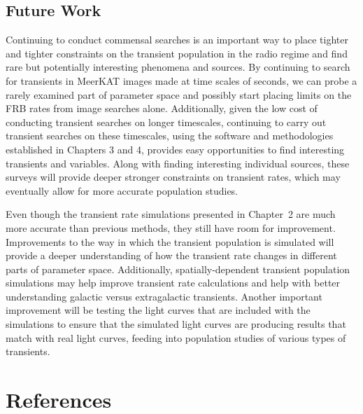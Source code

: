 \documentclass[12pt]{article}
\begin{document}
\subsection{Future Work}


Continuing to conduct commensal searches is an important way to place tighter and tighter constraints on the transient population in the radio regime and find rare but potentially interesting phenomena and sources. By continuing to search for transients in MeerKAT images made at time scales of seconds, we can probe a rarely examined part of parameter space and possibly start placing limits on the FRB rates from image searches alone. Additionally, given the low cost of conducting transient searches on longer timescales, continuing to carry out transient searches on these timescales, using the software and methodologies established in Chapters 3 and 4, provides easy opportunities to find interesting transients and variables. Along with finding interesting individual sources, these surveys will provide deeper stronger constraints on transient rates, which may eventually allow for more accurate population studies.

Even though the transient rate simulations presented in Chapter~2 are much more accurate than previous methods, they still have room for improvement. Improvements to the way in which the transient population is simulated will provide a deeper understanding of how the transient rate changes in different parts of parameter space. Additionally, spatially-dependent transient population simulations may help improve transient rate calculations and help with better understanding galactic versus extragalactic transients. Another important improvement will be testing the light curves that are included with the simulations to ensure that the simulated light curves are producing results that match with real light curves, feeding into population studies of various types of transients.

\newpage
\section{References}
{\def\section*#1{}
\singlespacing


}
\newpage
{}



\doublespacing
\appendix


\end{document}
